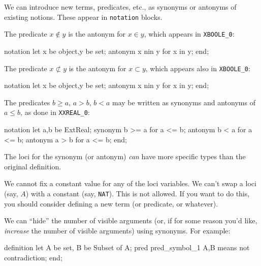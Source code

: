\begin{node}\label{mizar-001D}%
We can introduce new terms, predicates, etc., as synonyms or antonyms of
existing notions. These appear in \texttt{notation} blocks.

\begin{node}[Examples]\label{mizar-001E}%

\begin{node}\label{mizar-001F}%
  The predicate $x\notin y$ is the antonym for $x\in y$, which appears in
  \verb|XBOOLE_0|:
\begin{mizar}
notation
  let x be object,y be set;
  antonym x nin y for x in y;
end;
\end{mizar}
\end{node}
\begin{node}\label{mizar-001G}%
The predicate $x\nsubset y$ is the antonym for $x\subset y$, which
appears also in \verb|XBOOLE_0|:
\begin{mizar}
notation
  let x be object,y be set;
  antonym x nin y for x in y;
end;
\end{mizar}
\end{node}
\begin{node}\label{mizar-001H}%
The predicates $b\geq a$, $a > b$, $b < a$ may be written as synonyms
and antonyms of $a\leq b$, as done in \verb|XXREAL_0|:
\begin{mizar}
notation
  let a,b be ExtReal;
  synonym b >= a for a <= b;
  antonym b < a for a <= b;
  antonym a > b for a <= b;
end;
\end{mizar}
\end{node}
\end{node} %

\begin{node}\label{mizar-001I}%
The loci for the synonym (or antonym) \emph{can} have more specific
types than the original definition.
\end{node}

\begin{node}\label{mizar-001J}%
We cannot fix a constant value for any of the loci variables. We can't
swap a loci (say, $A$) with a constant (say, \texttt{NAT}). This is not
allowed. If you want to do this, you should consider defining a new term
(or predicate, or whatever).
\end{node}

\begin{node}\label{mizar-001K}%
We can ``hide'' the number of visible arguments (or, if for some reason
you'd like, \emph{increase} the number of visible arguments) using
synonyms. For example:
\begin{mizar}
definition
  let A be set, B be Subset of A;
  pred pred_symbol_1 A,B means not contradiction;
end;


\end{mizar}
\end{node}
\end{node}
